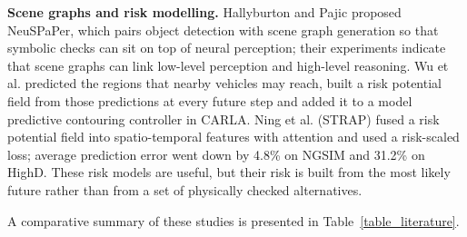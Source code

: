 \documentclass[preprint,12pt]{elsarticle}
\begin{document}
\textbf{Scene graphs and risk modelling.} Hallyburton and Pajic \cite{hallyburton2025neuspaper} proposed NeuSPaPer, which pairs object detection with scene graph generation so that symbolic checks can sit on top of neural perception; their experiments indicate that scene graphs can link low-level perception and high-level reasoning. Wu et al. \cite{wu2024riskfield} predicted the regions that nearby vehicles may reach, built a risk potential field from those predictions at every future step and added it to a model predictive contouring controller in CARLA. Ning et al. \cite{ning2025strap} (STRAP) fused a risk potential field into spatio-temporal features with attention and used a risk-scaled loss; average prediction error went down by 4.8\% on NGSIM and 31.2\% on HighD. These risk models are useful, but their risk is built from the most likely future rather than from a set of physically checked alternatives.

A comparative summary of these studies is presented in Table~\ref{table_literature}.
\end{document}
